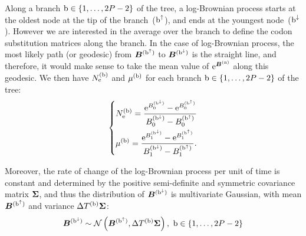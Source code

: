 Along a branch $\text{b} \in \{1, \hdots, 2 P - 2\}$ of the tree, a log-Brownian process starts at the oldest node at the tip of the branch~($\text{b}^{\uparrow}$), and ends at the youngest node~($\text{b}^{\downarrow}$).
However we are interested in the average over the branch to define the codon substitution matrices along the branch.
In the case of log-Brownian process, the most likely path (or geodesic) from $\bm{B}^{(\text{b}^{\uparrow})}$ to $\bm{B}^{(\text{b}^{\downarrow})}$ is the straight line, and therefore, it would make sense to take the mean value of $\mathrm{e}^{\bm{B}^{(\text{n})}}$ along this geodesic.
We then have $N_{\mathrm{e}}^{(\text{b})}$ and $\mu^{(\text{b})}$ for each branch $\text{b} \in \{1, \hdots, 2 P - 2\}$ of the tree:
\begin{equation}
\label{eq:branchNemu}
\begin{dcases}
\Ne\branchexp = \dfrac{\e^{\brownian_{0}^{(\nodeDown)}} - \e^{\brownian_{0}^{(\nodeUp)}}}{\brownian_{0}^{(\nodeDown)} - \brownian_{0}^{(\nodeUp)}} \\ 
\mu\branchexp = \dfrac{\e^{\brownian_{1}^{(\nodeDown)}} - \e^{\brownian_{1}^{(\nodeUp)}}}{\brownian_{1}^{(\nodeDown)} - \brownian_{1}^{(\nodeUp)}}.
\end{dcases}
\end{equation}

Moreover, the rate of change of the log-Brownian process per unit of time is constant and determined by the positive semi-definite and symmetric covariance matrix $\bm{\Sigma}$, and thus the distribution of $\bm{B}^{(\text{b}^{\downarrow})}$ is multivariate Gaussian, with mean $\bm{B}^{(\text{b}^{\uparrow})}$ and variance $\Delta T^{(\text{b})} \bm{\Sigma}$:
\begin{equation}
\label{eq:DistribBrownian}
\Brownian^{(\nodeDown)} \sim \mathcal{N}\left(\Brownian^{(\nodeUp)}, \branchtime\branchexp \CovarianceMatrix \right),\ \Setbranch
\end{equation}

